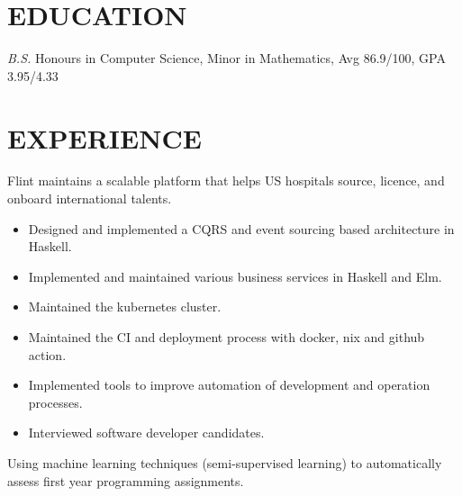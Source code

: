 \documentclass{resume}
\begin{document}


\section{EDUCATION}
\textit{B.S.} Honours in Computer Science, Minor in Mathematics, Avg 86.9/100, GPA 3.95/4.33

\section{EXPERIENCE}
    Flint maintains a scalable platform that helps US hospitals source, licence, and onboard international talents.

    \begin{itemize}
        \item Designed and implemented a CQRS and event sourcing based architecture in Haskell.

        \item Implemented and maintained various business services in Haskell and Elm.

        \item Maintained the kubernetes cluster.

        \item Maintained the CI and deployment process with docker, nix and github action.

        \item Implemented tools to improve automation of development and operation processes.

        \item Interviewed software developer candidates.
    \end{itemize}

     \vspace{-0.1in}

        Using machine learning techniques (semi-supervised learning) to automatically assess first year programming assignments.
\end{document}
